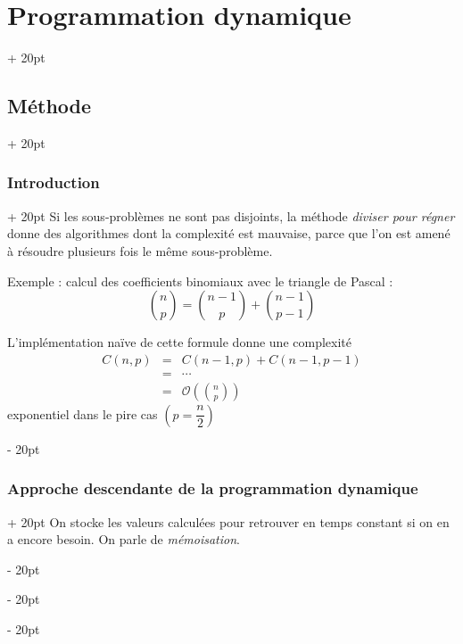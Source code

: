 \documentclass[a4paper, 12pt, twoside]{article}
\newcommand{\lr}[1]{\left( #1 \right)}
\newcommand{\ind}[1][20pt]{\advance\leftskip + #1}
\newcommand{\deind}[1][20pt]{\advance\leftskip - #1}
\newenvironment{indt}[2][20pt]{#2 \par \ind[#1]}{\par \deind} %
\begin{document}
    \vspace{12pt}
    
    \begin{indt}{\section{Programmation dynamique}}
        
        \begin{indt}{\subsection{Méthode}}
            \begin{indt}{\subsubsection{Introduction}}
                Si les sous-problèmes ne sont pas disjoints, la méthode \textit{diviser pour régner} donne des algorithmes dont la complexité est mauvaise, parce que l'on est amené à résoudre plusieurs fois le même sous-problème.
                
                \vspace{6pt}
                
                Exemple : calcul des coefficients binomiaux avec le triangle de Pascal :
                    \[ \binom n p = \binom{n - 1}{p} + \binom{n - 1}{p - 1} \]
                
                L'implémentation naïve de cette formule donne une complexité
                    \[
                        \begin{array}{rcl}
                            C(n, p) &=& C(n - 1, p) + C(n - 1, p - 1)
                            \\
                            &=& \cdots
                            \\
                            &=& \displaystyle \mathcal O\lr{\binom n p}
                        \end{array}
                    \]
                exponentiel dans le pire cas $\lr{p = \dfrac n 2}$
            \end{indt}
            
            \vspace{12pt}
            
            \begin{indt}{\subsubsection{Approche descendante de la programmation dynamique}}
                On stocke les valeurs calculées pour retrouver en temps constant si on en a encore besoin. On parle de \textit{mémoisation}.
                

\end{indt}
\end{indt}
\end{indt}
\end{document}
